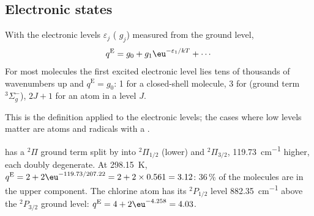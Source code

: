 \subsection*{Electronic states}

\begin{proposition}\label{prop:b3:partition-functions:q-elec}
With the electronic levels $\varepsilon_j$ ( $g_j$) measured from the ground
level,
\[
  q^{\mathrm E} = g_0 + g_1\eu^{-\varepsilon_1/kT} + \cdots
\]
For most molecules the first excited electronic level lies tens of thousands of
wavenumbers up and $q^{\mathrm E} = g_0$: 1 for a closed-shell molecule, 3 for
 (ground term ${}^3\Sigma_g^-$), $2J + 1$ for an atom in a level $J$.
\end{proposition}

This is the definition applied to the electronic levels; the cases where low
levels matter are atoms and radicals with a .

\begin{example}\label{ex:b3:partition-functions:no-cl}
 has a ${}^2\Pi$ ground term split by  into ${}^2\Pi_{1/2}$ (lower)
and ${}^2\Pi_{3/2}$, \qty{119.73}{cm^{-1}} higher, each doubly degenerate. At \qty{298.15}{K},
$q^{\mathrm E} = 2 + 2\eu^{-119.73/207.22} = 2 + 2\times0.561 = 3.12$: 36\,\% of the molecules are in
the upper component. The chlorine atom has its ${}^2P_{1/2}$ level \qty{882.35}{cm^{-1}}
above the ${}^2P_{3/2}$ ground level: $q^{\mathrm E} = 4 + 2\eu^{-4.258} = 4.03$.
\end{example}

